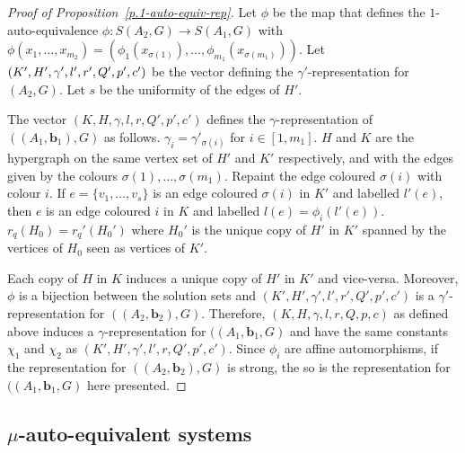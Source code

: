 \documentclass[10pt]{article}
\begin{document}
\begin{proof}[Proof of Proposition~\ref{p.1-auto-equiv-rep}]
Let $\phi$ be the map that defines the $1$-auto-equivalence $\phi: S(A_2,G) \to S(A_1,G)$ with $\phi(x_1,\ldots,x_{m_2})=\left(\phi_1(x_{\sigma(1)}),\ldots,\phi_{m_1}(x_{\sigma(m_1)})\right)$.
Let $(K',H', \gamma',\linebreak[1] l', r', Q', p', c')$ be the vector defining the $\gamma'$-representation for $(A_2,G)$. Let $s$ be the uniformity of the edges of $H'$. 

The vector $(K,H,\gamma,l,r,Q',p',c')$ defines the $\gamma$-representation of $((A_1,\mathbf{b}_1),G)$  
as follows.
$\gamma_i=\gamma'_{\sigma(i)}$ for $i\in[1,m_1]$. $H$ and $K$ are the hypergraph on the same vertex set of $H'$ and $K'$ respectively, and with the edges given by the colours $\sigma(1),\ldots,\sigma(m_1)$. Repaint the edge coloured $\sigma(i)$ with colour $i$. If $e=\{v_1,\ldots,v_s\}$ is an edge coloured $\sigma(i)$ in $K'$ and labelled $l'(e)$, then $e$ is an edge coloured $i$ in $K$ and labelled $l(e)=\phi_i(l'(e))$. $r_q(H_0)=r_q'(H_0')$ where $H_0'$ is the unique copy of $H'$ in $K'$ spanned by the vertices of $H_0$ seen as vertices of $K'$.



Each copy of $H$ in $K$ induces a unique copy of $H'$ in $K'$ and vice-versa. Moreover, $\phi$ is a bijection between the solution sets and $(K',H',\gamma',l',r',Q',p',c')$ is a $\gamma'$-representation for $((A_2,\mathbf{b}_2),G)$. Therefore, $(K,H,\gamma,l,r,Q,p,c)$ as defined above induces a $\gamma$-representation for $((A_1,\mathbf{b}_1,G)$ and have the same constants $\chi_1$ and $\chi_2$ as $(K',H',\gamma',l',r,Q',p',c')$. Since $\phi_i$ are affine automorphisms, if the representation for $((A_2,\mathbf{b}_2),G)$ is strong, the so is the representation for $((A_1,\mathbf{b}_1,G)$ here presented. 
\end{proof}












\subsection{$\mu$-auto-equivalent systems}
\end{document}
